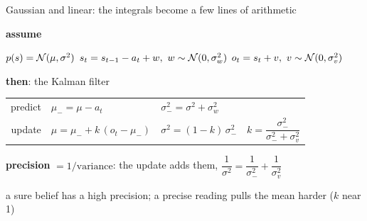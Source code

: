 \documentclass[10pt, aspectratio=169]{beamer}
\begin{document}
\begin{frame}{Gaussian and linear: the integrals become a few lines of arithmetic}
  \centering
  \vspace{0pt plus 1filll}
  {\large \textbf{assume}\par}
  \vspace{0.3em}
  $p(s) = \mathcal{N}(\mu, \sigma^2)$ \qquad
  $s_t = s_{t-1} - a_t + w,\ w \sim \mathcal{N}(0, \sigma_w^2)$ \qquad
  $o_t = s_t + v,\ v \sim \mathcal{N}(0, \sigma_v^2)$
  \vspace{0.6em}

  {\large \textbf{then}: \textcolor{accent}{the Kalman filter}\par}
  \vspace{0.3em}
  \renewcommand{\arraystretch}{1.6}
  \begin{tabular}{@{}r@{\qquad}l@{\qquad}l@{\qquad}l@{}}
    predict & $\mu_- = \mu - a_t$ & $\sigma_-^2 = \sigma^2 + \sigma_w^2$ & \\
    update & $\mu = \mu_- + k\,(o_t - \mu_-)$ & $\sigma^2 = (1 - k)\,\sigma_-^2$ & $k = \dfrac{\sigma_-^2}{\sigma_-^2 + \sigma_v^2}$ \\
  \end{tabular}

  \vspace{0.4em}
  {\normalsize \textbf{precision} $= 1/\text{variance}$: the update adds them,\; $\dfrac{1}{\sigma^2} = \dfrac{1}{\sigma_-^2} + \dfrac{1}{\sigma_v^2}$\par}
  {\footnotesize\color{muted} a sure belief has a high precision; a precise reading pulls the mean harder ($k$ near 1)\par}
  \vspace{0pt plus 1filll}
\end{frame}
\end{document}
